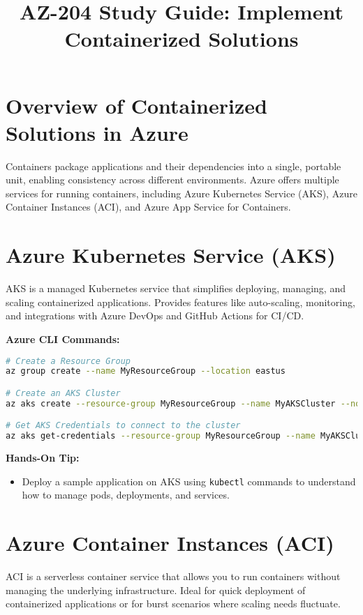 \documentclass{article}
\title{AZ-204 Study Guide: Implement Containerized Solutions}
\author{}
\date{}
\begin{document}
\maketitle

\section{Overview of Containerized Solutions in Azure}
Containers package applications and their dependencies into a single, portable unit, enabling consistency across different environments. Azure offers multiple services for running containers, including Azure Kubernetes Service (AKS), Azure Container Instances (ACI), and Azure App Service for Containers.

\section{Azure Kubernetes Service (AKS)}
AKS is a managed Kubernetes service that simplifies deploying, managing, and scaling containerized applications. Provides features like auto-scaling, monitoring, and integrations with Azure DevOps and GitHub Actions for CI/CD.

\textbf{Azure CLI Commands:}
\begin{lstlisting}[language=bash]
# Create a Resource Group
az group create --name MyResourceGroup --location eastus

# Create an AKS Cluster
az aks create --resource-group MyResourceGroup --name MyAKSCluster --node-count 1 --enable-addons monitoring --generate-ssh-keys

# Get AKS Credentials to connect to the cluster
az aks get-credentials --resource-group MyResourceGroup --name MyAKSCluster
\end{lstlisting}

\textbf{Hands-On Tip:}
\begin{itemize}
    \item Deploy a sample application on AKS using \texttt{kubectl} commands to understand how to manage pods, deployments, and services.
\end{itemize}

\section{Azure Container Instances (ACI)}
ACI is a serverless container service that allows you to run containers without managing the underlying infrastructure. Ideal for quick deployment of containerized applications or for burst scenarios where scaling needs fluctuate.
\end{document}
